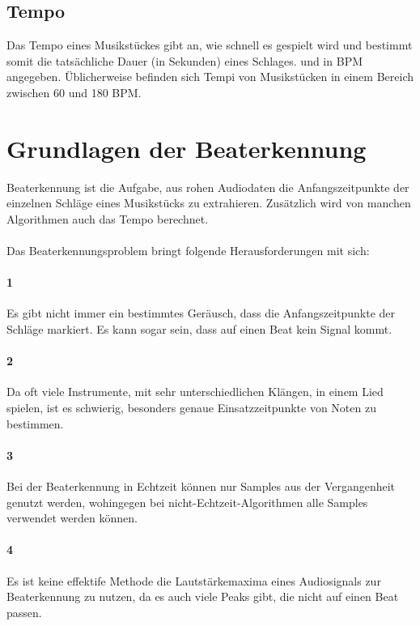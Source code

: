 {	\subsection{Tempo}
	{
		Das Tempo eines Musikstückes gibt an,
			wie schnell es gespielt wird
			und bestimmt somit die tatsächliche Dauer (in Sekunden) eines Schlages.
			und in \ac{BPM} angegeben.
		Üblicherweise befinden sich Tempi von Musikstücken in einem Bereich zwischen 60 und 180 \ac{BPM}.
	}
}

\section{Grundlagen der Beaterkennung}
{
	Beaterkennung ist die Aufgabe,
		aus rohen Audiodaten die Anfangszeitpunkte der einzelnen Schläge eines Musikstücks zu extrahieren.
	Zusätzlich wird von manchen Algorithmen auch das Tempo berechnet.

	\paragraph{}
	{
		Das Beaterkennungsproblem bringt folgende Herausforderungen mit sich:
	}

	\paragraph{1} %
	{
		Es gibt nicht immer ein bestimmtes Geräusch,
			dass die Anfangszeitpunkte der Schläge markiert.
		Es kann sogar sein, dass auf einen Beat kein Signal kommt.
	}

	\paragraph{2} %
	{
		Da oft viele Instrumente, mit sehr unterschiedlichen Klängen, in einem Lied spielen,
			ist es schwierig,
			besonders genaue Einsatzzeitpunkte von Noten zu bestimmen.
	}

	\paragraph{3} %
	{
		Bei der Beaterkennung in Echtzeit können nur Samples aus der Vergangenheit genutzt werden,
			wohingegen bei nicht-Echtzeit-Algorithmen alle Samples verwendet werden können.
	}

	\paragraph{4} %
	{
		Es ist keine effektife Methode die Lautstärkemaxima eines Audiosignals zur Beaterkennung zu nutzen,
			da es auch viele Peaks gibt,
			die nicht auf einen Beat passen.
	}

}
